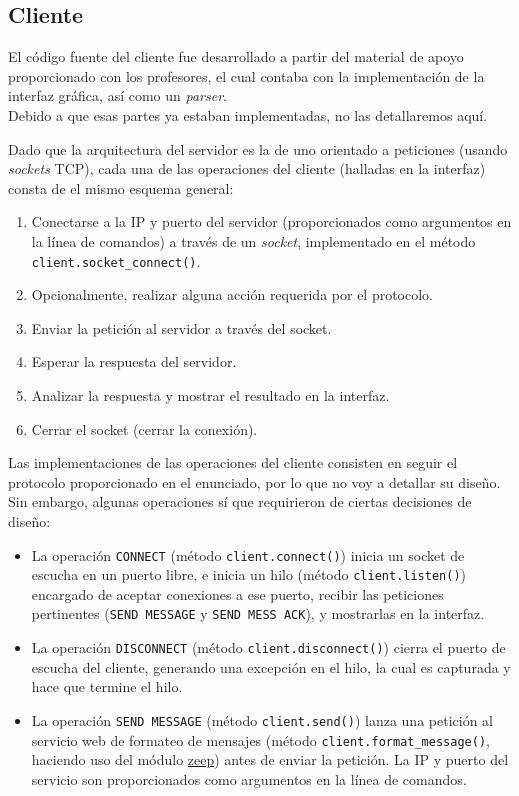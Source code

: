 \subsection{Cliente}

El código fuente del cliente fue desarrollado a partir del material de apoyo proporcionado con los profesores, el cual contaba con la implementación de la interfaz gráfica, así como un \textit{parser}.\\
Debido a que esas partes ya estaban implementadas, no las detallaremos aquí.\newline

Dado que la arquitectura del servidor es la de uno orientado a peticiones (usando \textit{sockets} TCP), cada una de las operaciones del cliente (halladas en la interfaz) consta de el mismo esquema general:
\begin{enumerate}
    \item Conectarse a la IP y puerto del servidor (proporcionados como argumentos en la línea de comandos) a través de un \textit{socket}, implementado en el método \texttt{client.socket\_connect()}.
    \item Opcionalmente, realizar alguna acción requerida por el protocolo.
    \item Enviar la petición al servidor a través del socket.
    \item Esperar la respuesta del servidor.
    \item Analizar la respuesta y mostrar el resultado en la interfaz.
    \item Cerrar el socket (cerrar la conexión).
\end{enumerate}

Las implementaciones de las operaciones del cliente consisten en seguir el protocolo proporcionado en el enunciado, por lo que no voy a detallar su diseño.\\
Sin embargo, algunas operaciones sí que requirieron de ciertas decisiones de diseño:
\begin{itemize}
    \item La operación \texttt{CONNECT} (método \texttt{client.connect()}) inicia un socket de escucha en un puerto libre, e inicia un hilo (método \texttt{client.listen()}) encargado de aceptar conexiones a ese puerto, recibir las peticiones pertinentes (\texttt{SEND MESSAGE} y \texttt{SEND MESS ACK}), y mostrarlas en la interfaz.
    \item La operación \texttt{DISCONNECT} (método \texttt{client.disconnect()}) cierra el puerto de escucha del cliente, generando una excepción en el hilo, la cual es capturada y hace que termine el hilo.
    \item La operación \texttt{SEND MESSAGE} (método \texttt{client.send()}) lanza una petición al servicio web de formateo de mensajes (método \texttt{client.format\_message()}, haciendo uso del módulo \href{https://pypi.org/project/zeep/}{zeep}) antes de enviar la petición. La IP y puerto del servicio son proporcionados como argumentos en la línea de comandos.
\end{itemize}

